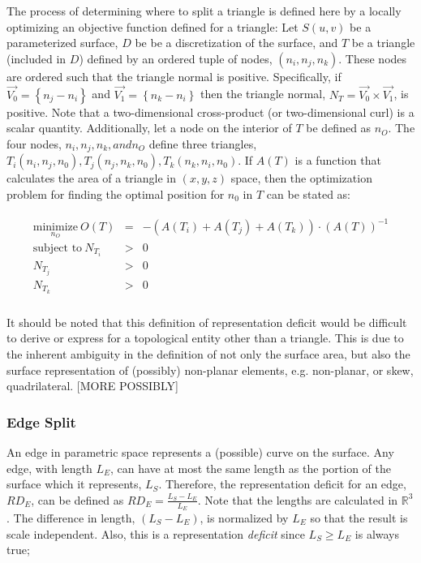 The process of determining where to split a triangle is defined here by
a locally optimizing an objective function defined for a triangle: Let
$S(u,v)$ be a parameterized surface, $D$ be be a discretization of the
surface, and $T$ be a triangle (included in $D$) defined by an ordered
tuple of nodes, $\left(n_i, n_j, n_k\right)$. These nodes are ordered
such that the triangle normal is positive. Specifically, if $\vec{V_0} =
\left\{n_j - n_i \right\}$ and $\vec{V_1} = \left\{n_k - n_i\right\}$
then the triangle normal, $N_T = \vec{V_0} \times \vec{V_1}$, is
positive. Note that a two-dimensional cross-product (or two-dimensional
curl) is a scalar quantity. Additionally, let a node on the interior of
$T$ be defined as $n_O$. The four nodes, $n_i, n_j, n_k, and n_O$ define
three triangles, $T_i\left(n_i,n_j,n_0\right), T_j\left(n_j, n_k,
n_0\right), T_k\left(n_k, n_i, n_0\right)$. If $A(T)$ is a function that
calculates the area of a triangle in $\left(x,y,z\right)$ space, then
the optimization problem for finding the optimal position for $n_0$ in
$T$ can be stated as:

\begin{eqnarray*}
\begin{array}{rcl}
\underset{n_O}{\text{minimize}} \ O(T) & = & -\left(A\left(T_i\right) + A\left(T_j\right) + A\left(T_k\right) \right) \cdot \left(A\left(T\right) \right)^{-1}\\
\text{subject to} \ N_{T_i} & > & 0 \\
N_{T_j} & > & 0 \\ 
N_{T_k} & > & 0 \\
\end{array}
\end{eqnarray*}

It should be noted that this definition of representation deficit would be difficult to derive or express for a topological entity other than a triangle. This is due to the inherent ambiguity in the definition of not only the surface area, but also the surface representation of (possibly) non-planar elements, e.g. non-planar, or skew, quadrilateral. [MORE POSSIBLY]

\subsubsection{Edge Split}
An edge in parametric space represents a (possible) curve on the
surface. Any edge, with length $L_E$, can have at most the same length
as the portion of the surface which it represents, $L_S$. Therefore, the
representation deficit for an edge, $RD_E$, can be defined as $RD_E =
\frac{L_S - L_E}{L_E}$. Note that the lengths are calculated in
${\mathbb R}^3$. The difference in length, $\left(L_S - L_E\right)$, is
normalized by $L_E$ so that the result is scale independent. Also, this
is a representation {\it deficit} since $L_S \ge L_E$ is always true;

